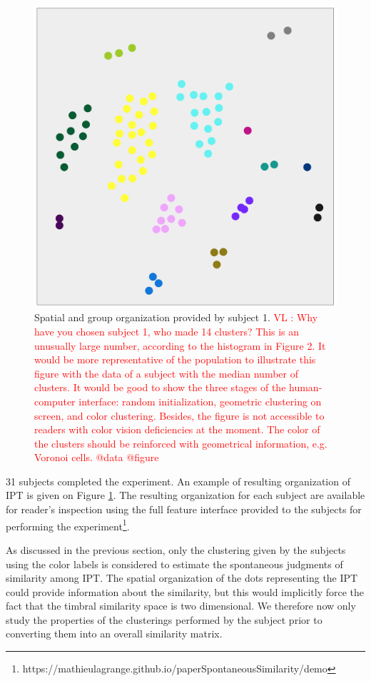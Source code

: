 \documentclass{article}
\makeatletter
\newcommand*{\eg}{e.g.\@\xspace}
\newcommand{\ipt}{IPT\xspace}
\newcommand{\vl}[1]{\textcolor{red}{VL : #1}}
\makeatother
\begin{document}
\begin{figure}
\center
\includegraphics[width = \textwidth]{figures/xp2example.png}
\caption{Spatial and group organization provided by subject 1.
\vl{
Why have you chosen subject 1, who made 14 clusters?
This is an unusually large number, according to the
histogram in Figure 2.
It would be more representative of the population to illustrate this figure
with the data of a subject with the median number of clusters.
It would be good to show the three stages of the human-computer interface:
random initialization,
geometric clustering on screen,
and color clustering.
Besides, the figure is not accessible to readers with
color vision deficiencies at the moment.
The color of the clusters should be reinforced with
geometrical information, \eg{} Voronoi cells.
@data @figure}}
\label{fig:xp2display}
\end{figure}

31 subjects completed the experiment. An example of resulting organization of \ipt is given on Figure \ref{fig:xp2display}. The resulting organization for each subject are available for reader's inspection using the full feature interface provided to the subjects for performing the experiment\footnote{https://mathieulagrange.github.io/paperSpontaneousSimilarity/demo}.

As discussed in the previous section, only the clustering given by the subjects using the color labels is considered to estimate the spontaneous judgments of similarity among \ipt. The spatial organization of the dots representing the \ipt could provide information about the similarity, but this would implicitly force the fact that the timbral similarity space is two dimensional. We therefore now only study the properties of the clusterings performed by the subject prior to converting them into an overall similarity matrix.
\end{document}
